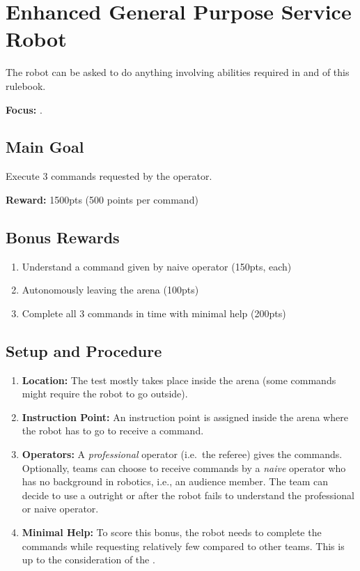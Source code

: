 \section{Enhanced General Purpose Service Robot}
\label{test:egpsr}
The robot can be asked to do anything involving abilities required in \SONE{} and \STWO{} of this rulebook.

\noindent \textbf{Focus:} \SysI{}.

\subsection*{Main Goal}
Execute 3 commands requested by the operator.

\noindent\textbf{Reward:} 1500pts (500 points per command)

\subsection*{Bonus Rewards}
\begin{enumerate}[nosep]
	\item Understand a command given by naive operator (150pts, each)
	\item Autonomously leaving the arena (100pts)
	\item Complete all 3 commands in time with minimal help (200pts)
\end{enumerate}

%
%
\subsection*{Setup and Procedure}
\begin{enumerate}
	\item \textbf{Location:} The test mostly takes place inside the arena (some commands might require the robot to go outside).
	
	\item \textbf{Instruction Point:} An instruction point is assigned inside the arena where the robot has to go to receive a command.

	\item \textbf{Operators:} A \emph{professional} operator (i.e.~the referee) gives the commands. Optionally, teams can choose to receive commands by a \emph{naive} operator who has no background in robotics, i.e., an audience member. The team can decide to use a \CustomOperator{} outright or after the robot fails to understand the professional or naive operator.
	
	\item \textbf{Minimal Help:} To score this bonus, the robot needs to complete the commands while requesting relatively few  compared to other teams. This is up to the consideration of the .
\end{enumerate}

